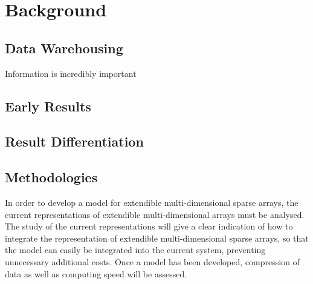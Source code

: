 %
%
%
%
%
\chapter{Background} \label{chap:background}


\section{Data Warehousing}
Information is incredibly important \cite{golfarelli:2009:dwd} 

\section{Early Results}


\section{Result Differentiation}


\section{Methodologies}
In order to develop a model for extendible multi-dimensional sparse arrays, the current representations of extendible multi-dimensional arrays must be analysed. The study of the current representations will give a clear indication of how to integrate the representation of extendible multi-dimensional sparse arrays, so that the model can easily be integrated into the current system, preventing unnecessary additional costs. Once a model has been developed, compression of data as well as computing speed will be assessed.

